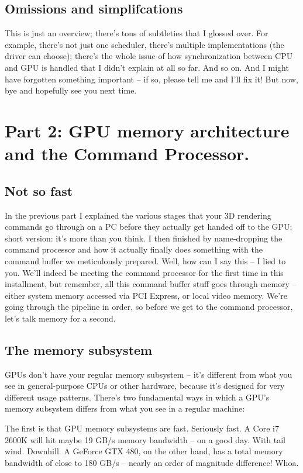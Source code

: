 \documentclass[12pt]{article}
\begin{document}
\subsection{Omissions and simplifcations}
\label{sec:orgc7a175b}
This is just an overview; there’s tons of subtleties that I glossed over.
For example, there’s not just one scheduler, there’s multiple implementations (the driver can choose); there’s the whole issue of how synchronization between CPU and GPU is handled that I didn’t explain at all so far.
And so on.
And I might have forgotten something important – if so, please tell me and I’ll fix it! But now, bye and hopefully see you next time.

\section{Part 2: GPU memory architecture and the Command Processor.}
\label{sec:org9d4cf4a}
\label{part2}
\subsection{Not so fast}
\label{sec:org58f2df2}

In the previous part I explained the various stages that your 3D rendering commands go through on a PC before they actually get handed off to the GPU; short version: it’s more than you think. I then finished by name-dropping the command processor and how it actually finally does something with the command buffer we meticulously prepared. Well, how can I say this – I lied to you. We’ll indeed be meeting the command processor for the first time in this installment, but remember, all this command buffer stuff goes through memory – either system memory accessed via PCI Express, or local video memory. We’re going through the pipeline in order, so before we get to the command processor, let’s talk memory for a second.

\subsection{The memory subsystem}
\label{sec:orge470cb1}

GPUs don’t have your regular memory subsystem – it’s different from what you see in general-purpose CPUs or other hardware, because it’s designed for very different usage patterns. There’s two fundamental ways in which a GPU’s memory subsystem differs from what you see in a regular machine:

The first is that GPU memory subsystems are fast. Seriously fast. A Core i7 2600K will hit maybe 19 GB/s memory bandwidth – on a good day. With tail wind. Downhill. A GeForce GTX 480, on the other hand, has a total memory bandwidth of close to 180 GB/s – nearly an order of magnitude difference! Whoa.
\end{document}
